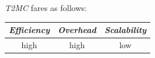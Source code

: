 %
%
%
%
\emph{T2MC} fares as follows:
\begin{center}
\begin{tabular}{ccc}
\emph{Efficiency} & \emph{Overhead} & \emph{Scalability} \\
\hline
high &
high &
low
\end{tabular}
\end{center}

